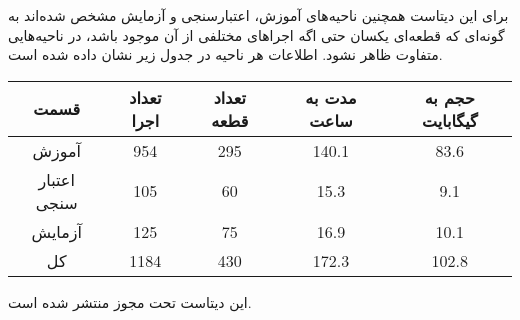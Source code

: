 برای این دیتاست همچنین ناحیه‌های آموزش، اعتبارسنجی و آزمایش مشخص شده‌اند به
گونه‌ای که قطعه‌ای یکسان حتی اگه اجراهای مختلفی از آن موجود باشد، در ناحیه‌هایی
متفاوت ظاهر نشود. اطلاعات هر ناحیه در جدول زیر نشان داده شده است.

\begin{center}
    \begin{tabular}{| c | c | c | c | c |}
        \hline
        قسمت & تعداد اجرا & تعداد قطعه & مدت به ساعت & حجم به گیگابایت
        \\ \hline
        آموزش & 954 & 295 & 140.1 & 83.6
        \\ \hline
        اعتبار سنجی & 105 & 60 & 15.3 & 9.1
        \\ \hline
        آزمایش & 125 & 75 & 16.9 & 10.1
        \\ \hline
        کل & 1184 & 430 & 172.3 & 102.8
        \\ \hline
    \end{tabular}
\end{center}

این دیتاست تحت مجوز
منتشر شده‌ است.